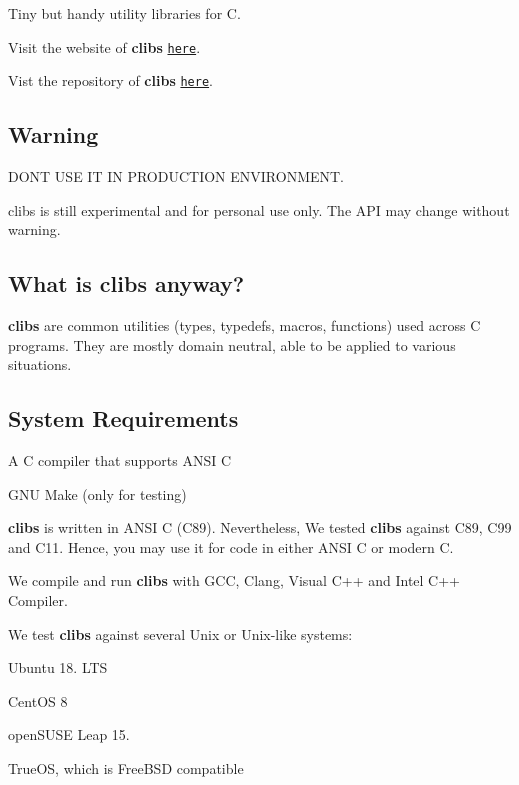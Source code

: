 \href{https://opensource.org/licenses/MIT}{\tt } \href{https://ci.appveyor.com/project/cwchentw/clibs}{\tt }

Tiny but handy utility libraries for C.

Visit the website of {\bfseries clibs} \href{https://cwchentw.github.io/clibs/html/index.html}{\tt here}.

Vist the repository of {\bfseries clibs} \href{https://github.com/cwchentw/clibs/}{\tt here}.

\subsection*{Warning}

D\+ON\textquotesingle{}T U\+SE IT IN P\+R\+O\+D\+U\+C\+T\+I\+ON E\+N\+V\+I\+R\+O\+N\+M\+E\+NT.

clibs is still experimental and for personal use only. The A\+PI may change without warning.

\subsection*{What is clibs anyway?}

{\bfseries clibs} are common utilities (types, typedefs, macros, functions) used across C programs. They are mostly domain neutral, able to be applied to various situations.

\subsection*{System Requirements}


\begin{DoxyItemize}
\item A C compiler that supports A\+N\+SI C
\item G\+NU Make (only for testing)
\end{DoxyItemize}

{\bfseries clibs} is written in A\+N\+SI C (C89). Nevertheless, We tested {\bfseries clibs} against C89, C99 and C11. Hence, you may use it for code in either A\+N\+SI C or modern C.

We compile and run {\bfseries clibs} with G\+CC, Clang, Visual C++ and Intel C++ Compiler.

We test {\bfseries clibs} against several Unix or Unix-\/like systems\+:


\begin{DoxyItemize}
\item Ubuntu 18. L\+TS
\item Cent\+OS 8
\item open\+S\+U\+SE Leap 15.
\item True\+OS, which is Free\+B\+SD compatible
\end{DoxyItemize}

